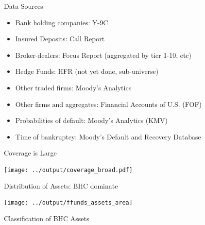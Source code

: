 \documentclass[12pt,envcountsect, leqno,xcolor=dvipsnames]{beamer}
\newcommand{\bi}{\begin{itemize}}
\newcommand{\ei}{\end{itemize}}
\begin{document}
\begin{frame}{Data Sources} 

\bi
\item Bank holding companies: Y-9C 
\item Insured Deposits: Call Report
\item Broker-dealers: Focus Report (aggregated by tier 1-10, etc)
\item Hedge Funds: HFR (not yet done, sub-universe)
\item Other traded firms: Moody's Analytics
\item Other firms and aggregates: Financial Accounts of U.S. (FOF)
\item Probabilities of default: Moody's Analytics (KMV)
\item Time of bankruptcy: Moody's Default and Recovery Database
\ei
\end{frame}

\begin{frame}{Coverage is Large}

\begin{center}
\texttt{[image: ../output/coverage\_broad.pdf]}
\end{center}

\end{frame}


\begin{frame}{Distribution of Assets: BHC dominate} 
\begin{center}
\texttt{[image: ../output/ffunds\_assets\_area]}
\end{center}

\end{frame}

\begin{frame}{Classification of BHC Assets}

\begin{table} [H]\centering \scriptsize
\begin{minipage}{.48\textwidth}
\setlength{\tabcolsep}{12pt}

\end{minipage}%
\begin{minipage}{.48\textwidth}

\end{minipage}
\centering
\end{table}

\end{frame}
\end{document}
